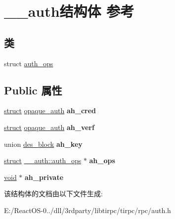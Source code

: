 \hypertarget{struct____auth}{}\section{\+\_\+\+\_\+auth结构体 参考}
\label{struct____auth}
\subsection*{类}
\begin{DoxyCompactItemize}
\item 
struct \hyperlink{struct____auth_1_1auth__ops}{auth\+\_\+ops}
\end{DoxyCompactItemize}
\subsection*{Public 属性}
\begin{DoxyCompactItemize}
\item 
\mbox{\label{struct____auth_a5de19016bd2a371c696a5e516c68f042}} 
\hyperlink{interfacestruct}{struct} \hyperlink{structopaque__auth}{opaque\+\_\+auth} {\bfseries ah\+\_\+cred}
\item 
\mbox{\label{struct____auth_ad364b7b18782194e46fadaf96c970d9e}} 
\hyperlink{interfacestruct}{struct} \hyperlink{structopaque__auth}{opaque\+\_\+auth} {\bfseries ah\+\_\+verf}
\item 
\mbox{\label{struct____auth_a0dcdeb7de0696a4aeafe962b59335c55}} 
union \hyperlink{uniondes__block}{des\+\_\+block} {\bfseries ah\+\_\+key}
\item 
\mbox{\label{struct____auth_ab5f2f31f992190385fb778d42b71f86c}} 
\hyperlink{interfacestruct}{struct} \hyperlink{struct____auth_1_1auth__ops}{\+\_\+\+\_\+auth\+::auth\+\_\+ops} $\ast$ {\bfseries ah\+\_\+ops}
\item 
\mbox{\label{struct____auth_a8df269a0f48edea77ced282d4725226c}} 
\hyperlink{interfacevoid}{void} $\ast$ {\bfseries ah\+\_\+private}
\end{DoxyCompactItemize}


该结构体的文档由以下文件生成\+:\begin{DoxyCompactItemize}
\item 
E\+:/\+React\+O\+S-\/0../dll/3rdparty/libtirpc/tirpc/rpc/auth.\+h\end{DoxyCompactItemize}
